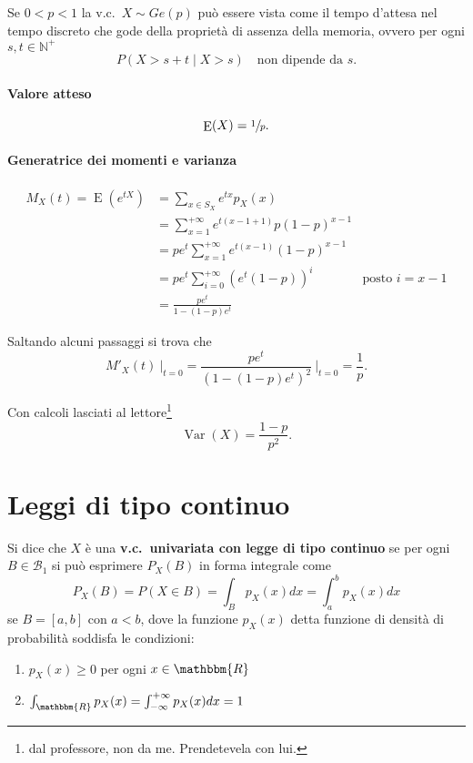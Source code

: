\documentclass[11pt,a4paper,twoside]{article}
\let\geq\geqslant%
\newcommand\N{\mathbb{N}}
\newcommand\R{\mathbbm{R}}
\newcommand\B{\mathcal{B}}
\newcommand{\computedat}[1]{\:\bigg\rvert_{#1}}
\DeclareMathOperator{\Var}{Var}
\DeclareMathOperator{\E}{E}
\begin{document}
Se \(0 < p < 1\) la v.c.\ \(X\sim Ge(p)\) può essere vista come il
tempo d'attesa nel tempo discreto che gode della proprietà di assenza
della memoria, ovvero per ogni \(s,t \in \N^+\)
\[
  P(X>s+t \mid X>s) \quad\mbox{non dipende da } s.
\]

\paragraph{Valore atteso}
\[
  \E(X) = \sfrac{1}{p}.
\]

\paragraph{Generatrice dei momenti e varianza}
\begin{align*}
  M_X(t) = \E(e^{tX})
  &= \sum_{x\in S_X} e^{tx} p_X(x)  &\\
  &= \sum_{x=1}^{+\infty} e^{t(x-1+1)}p(1-p)^{x-1} &\\
  &= pe^t \sum_{x=1}^{+\infty} e^{t(x-1)}(1-p)^{x-1} &\\
  &= pe^t \sum_{i=0}^{+\infty} (e^t(1-p))^i &\mbox{posto } i = x-1 \\
  &= \frac{ pe^t }{ 1-(1-p)e^t }
\end{align*}

Saltando alcuni passaggi si trova che
\[
  M'_X(t) \computedat{t=0}
  = \frac{pe^t}{\left( 1-(1-p)e^t \right)^2} \computedat{t=0}
  = \frac{1}{p}.
\]

Con calcoli lasciati al lettore\footnote{dal professore, non da
  me. Prendetevela con lui.}
\[
  \Var(X) = \frac{1-p}{p^2}.
\]

\section{Leggi di tipo continuo}

Si dice che \(X\) è una \textbf{v.c.\ univariata con legge di tipo
  continuo} se per ogni \(B\in\B_1\) si può esprimere \(P_X(B)\) in
forma integrale come
\[
  P_X(B) = P(X\in B) = \int_B p_X(x)dx = \int_a^b p_X(x) dx
\]
se \(B = [a,b]\) con \(a < b\), dove la funzione \(p_X(x)\) detta
funzione di densità di probabilità soddisfa le condizioni:
\begin{enumerate}
\item \(p_X(x) \geq 0\) per ogni \(x\in\R\)
\item \(\int_\R p_X(x) = \int_{-\infty}^{+\infty} p_X(x) dx = 1\)
\end{enumerate}
\end{document}
